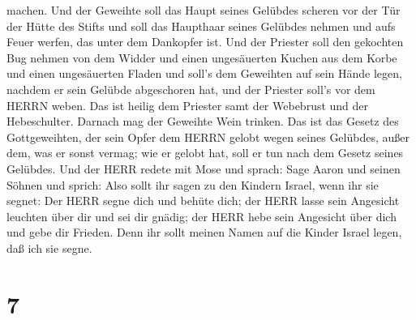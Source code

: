 machen.  Und der Geweihte soll das Haupt seines Gelübdes
scheren vor der Tür der Hütte des Stifts und soll das Haupthaar seines
Gelübdes nehmen und aufs Feuer werfen, das unter dem Dankopfer ist.
 Und der Priester soll den gekochten Bug nehmen von dem
Widder und einen ungesäuerten Kuchen aus dem Korbe und einen
ungesäuerten Fladen und soll's dem Geweihten auf sein Hände legen,
nachdem er sein Gelübde abgeschoren hat,  und der Priester
soll's vor dem HERRN weben. Das ist heilig dem Priester samt der
Webebrust und der Hebeschulter. Darnach mag der Geweihte Wein trinken.
 Das ist das Gesetz des Gottgeweihten, der sein Opfer dem
HERRN gelobt wegen seines Gelübdes, außer dem, was er sonst vermag; wie
er gelobt hat, soll er tun nach dem Gesetz seines Gelübdes.
 Und der HERR redete mit Mose und sprach: 
Sage Aaron und seinen Söhnen und sprich: Also sollt ihr sagen zu den
Kindern Israel, wenn ihr sie segnet:  Der HERR segne dich
und behüte dich;  der HERR lasse sein Angesicht leuchten
über dir und sei dir gnädig;  der HERR hebe sein Angesicht
über dich und gebe dir Frieden.  Denn ihr sollt meinen
Namen auf die Kinder Israel legen, daß ich sie segne.

\hypertarget{section-6}{%
\section{7}\label{section-6}}

